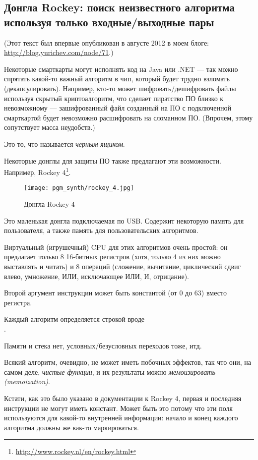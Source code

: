 ﻿\subsection{Донгла Rockey: поиск неизвестного алгоритма используя только входные/выходные пары}

(Этот текст был впервые опубликован в августе 2012 в моем блоге: \url{http://blog.yurichev.com/node/71}.)

Некоторые смарткарты могут исполнять код на Java или .NET --- так можно спрятать какой-то важный алгоритм в чип,
который будет трудно взломать (декапсулировать).
Например, кто-то может шифровать/дешифровать файлы используя скрытый криптоалгоритм, что сделает
пиратство ПО близко к невозможному --- зашифрованный файл созданный на ПО с подключенной смарткартой
будет невозможно расшифровать на сломанном ПО.
(Впрочем, этому сопутствует масса неудобств.)

Это то, что называется \textit{черным ящиком}.

Некоторые донглы для защиты ПО также предлагают эти возможности.
Например, Rockey 4\footnote{\url{http://www.rockey.nl/en/rockey.html}}.

\begin{figure}[H]
\centering
\texttt{[image: pgm\_synth/rockey\_4.jpg]}
\caption{Донгла Rockey 4}
\end{figure}

Это маленькая донгла подключаемая по USB. Содержит некоторую память для пользователя, а также память для пользовательских
алгоритмов.

Виртуальный (игрушечный) CPU для этих алгоритмов очень простой: он предлагает только 8 16-битных регистров
(хотя, только 4 из них можно выставлять и читать) и 8 операций
(сложение, вычитание, циклический сдвиг влево, умножение, ИЛИ, исключающее ИЛИ, И, отрицание).

Второй аргумент инструкции может быть константой (от 0 до 63) вместо регистра.

Каждый алгоритм определяется строкой вроде \\
.

Памяти и стека нет, условных/безусловных переходов тоже, итд.

Всякий алгоритм, очевидно, не может иметь побочных эффектов, так что они, на самом деле, \textit{чистые функции},
и их результаты можно \textit{мемоизировать (memoization)}.

Кстати, как это было указано в документации к Rockey 4, первая и последняя инструкции не могут иметь констант.
Может быть это потому что эти поля используются для какой-то внутренней информации:
начало и конец каждого алгоритма должны же как-то маркироваться.

